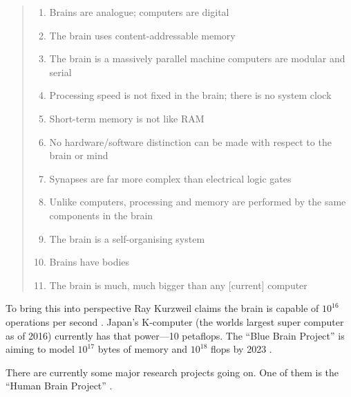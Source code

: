 \begin{quotation}
  \begin{enumerate}
    \item Brains are analogue; computers are digital
    \item The brain uses content-addressable memory
    \item The brain is a massively parallel machine computers are modular and serial
    \item Processing speed is not fixed in the brain; there is no system clock
    \item Short-term memory is not like RAM
    \item No hardware/software distinction can be made with respect to the brain or mind
    \item Synapses are far more complex than electrical logic gates
    \item Unlike computers, processing and memory are performed by the same components in the brain
    \item The brain is a self-organising system
    \item Brains have bodies
    \item	The brain is much, much bigger than any [current] computer
  \end{enumerate}
\end{quotation}

To bring this into perspective Ray Kurzweil claims the brain is capable of $10^{16}$ operations per second \citeyear[p.194]{Kurzweil2013}. Japan's K-computer (the worlds largest super computer as of 2016) currently has that power---10 petaflops. The ``Blue Brain Project'' is aiming to model $10^17$ bytes of memory and $10^{18}$ flops by 2023 \autocite[p.125]{Kurzweil2013}.

There are currently some major research projects going on. One of them is the ``Human Brain Project'' \autocite{Walker2012}.

